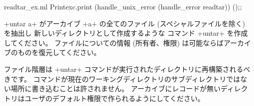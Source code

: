 \begin{answer}
\begin{listingcodefile}{readtar_ex.ml}
Printexc.print (handle_unix_error (handle_error readtar)) ();;
\end{listingcodefile}
\end{answer}

\begin{exercise}\label{ex/untar}
\ml+untar a+ がアーカイブ \ml+a+ の全てのファイル (スペシャルファイルを除く) を抽出し
新しいディレクトリとして作成するような
コマンド \ml+untar+ を作成してください。
ファイルについての情報 (所有者、権限) は可能ならばアーカイブのものを復元してください。

ファイル階層は \ml+untar+ コマンドが実行されたディレクトリに再構築されるべきです。
コマンドが現在のワーキングディレクトリのサブディレクトリではない場所に書き込むことは許されません。
アーカイブにレコードが無いディレクトリはユーザのデフォルト権限で作られるようにしてください。
\end{exercise}

